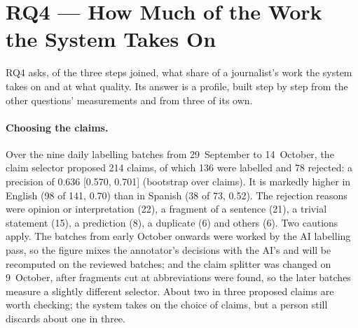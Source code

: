 
\section{RQ4 --- How Much of the Work the System Takes On}
\label{sec:results-rq4}

RQ4 asks, of the three steps joined, what share of a journalist's work
the system takes on and at what quality. Its answer is a profile, built
step by step from the other questions' measurements and from three of
its own.

\paragraph{Choosing the claims.} Over the nine daily labelling batches
from 29~September to 14~October, the claim selector proposed 214
claims, of which 136 were labelled and 78 rejected: a precision of
0.636 [0.570, 0.701] (bootstrap over claims). It is markedly higher in
English (98 of 141, 0.70) than in Spanish (38 of 73, 0.52). The
rejection reasons were opinion or interpretation (22), a fragment of a
sentence (21), a trivial statement (15), a prediction (8), a duplicate
(6) and others (6). Two cautions apply. The batches from early October
onwards were worked by the AI labelling pass, so the figure mixes the
annotator's decisions with the AI's and will be recomputed on the
reviewed batches; and the claim splitter was changed on 9~October,
after fragments cut at abbreviations were found, so the later batches
measure a slightly different selector. About two in three proposed
claims are worth checking; the system takes on the choice of claims,
but a person still discards about one in three.

